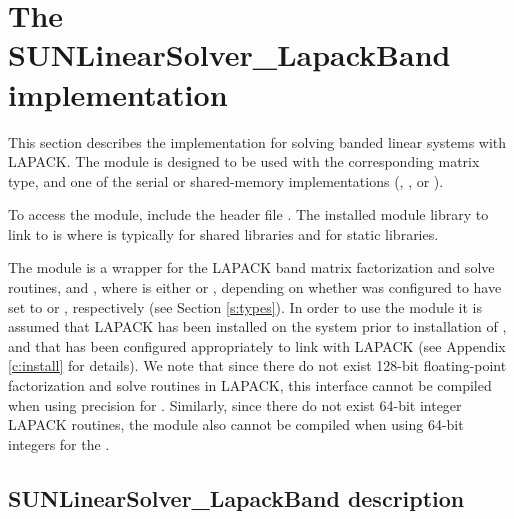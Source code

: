 \section{The SUNLinearSolver\_LapackBand implementation}
\label{ss:sunlinsol_lapband}

This section describes the {\sunlinsol} implementation for solving banded linear
systems with LAPACK. The {\sunlinsollapband} module is designed to be used with the
corresponding {\sunmatband} matrix type, and one of the serial or
shared-memory {\nvector} implementations ({\nvecs}, {\nvecopenmp}, or
{\nvecpthreads}).

To access the {\sunlinsollapband} module, include the header file \newline
{}. The installed module library to link
to is \newline
{} where 
is typically  for shared libraries and  for static libraries.

The {\sunlinsollapband} module is a {\sunlinsol} wrapper for
the LAPACK band matrix factorization and solve routines, 
and , where \id{*} is either  or , depending on
whether {\sundials} was configured to have  set to
 or , respectively (see Section \ref{s:types}).
In order to use the {\sunlinsollapband} module it is assumed
that LAPACK has been installed on the system prior to installation of
{\sundials}, and that {\sundials} has been configured appropriately to
link with LAPACK (see Appendix \ref{c:install} for details).
We note that since there do not exist 128-bit floating-point
factorization and solve routines in LAPACK, this interface cannot be
compiled when using  precision for .
Similarly, since there do not exist 64-bit integer LAPACK routines,
the {\sunlinsollapband} module also cannot be compiled when using
64-bit integers for the . {\warn}


\subsection{SUNLinearSolver\_LapackBand description}
\label{ss:sunlinsol_lapband_description}

